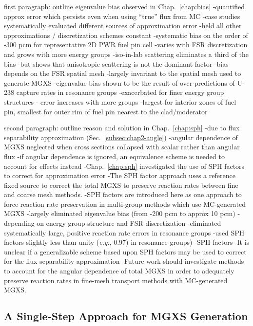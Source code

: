 first paragraph: outline eigenvalue bias observed in Chap.~\ref{chap:bias}
-quantified approx error which persists even when using ``true'' flux from \ac{MC}
-case studies systematically evaluated different sources of approximation error
  -held all other approximations / discretization schemes constant
-systematic bias on the order of -300 \ac{pcm} for representative 2D \ac{PWR} fuel pin cell
  -varies with \ac{FSR} discretization and grows with more energy groups
  -iso-in-lab scattering eliminates a third of the bias
    -but shows that anisotropic scattering is not the dominant factor
  -bias depends on the \ac{FSR} spatial mesh
    -largely invariant to the spatial mesh used to generate \ac{MGXS}
-eigenvalue bias shown to be the result of over-predictions of U-238 capture rates in resonance groups
  -exacerbated for finer energy group structures - error increases with more groups
  -largest for interior zones of fuel pin, smallest for outer rim of fuel pin nearest to the clad/moderator

second paragraph: outline reason and solution in Chap.~\ref{chap:sph}
-due to flux separability approximation (Sec.~\ref{subsec:chap2-angle})
  -angular dependence of \ac{MGXS} neglected when cross sections collapsed with scalar rather than angular flux
  -if angular dependence is ignored, an equivalence scheme is needed to account for effects instead
-Chap.~\ref{chap:sph} investigated the use of \ac{SPH} factors to correct for approximation error
  -The \ac{SPH} factor approach uses a reference fixed source to correct the total \ac{MGXS} to preserve reaction rates between fine and coarse mesh methods.
  -SPH factors are introduced here as one approach to force reaction rate preservation in multi-group methods which use MC-generated MGXS
-largely eliminated eigenvalue bias (from -200 \ac{pcm} to approx 10 \ac{pcm})
  -depending on energy group structure and \ac{FSR} discretization
-eliminated systematically large, positive reaction rate errors in resonance groups
-used \ac{SPH} factors slightly less than unity (\textit{e.g.}, 0.97) in resonance groups)
-\ac{SPH} factors
-It is unclear if a generalizable scheme based upon SPH factors may be used to correct for the flux separability approximation
-Future work should investigate methods to account for the angular dependence of total MGXS in order to adequately preserve reaction rates in fine-mesh transport methods with MC-generated MGXS.

\subsection{A Single-Step Approach for MGXS Generation}
\label{subsec:chap12-single-step}

